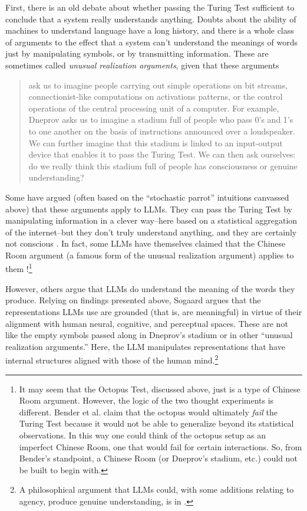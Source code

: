 
First, there is an old debate about whether passing the Turing Test sufficient
to conclude that a system really understands anything. Doubts about the ability
of machines to understand language have a long history, and there is a whole
class of arguments to the effect that a system can't understand the meanings of
words just by manipulating symbols, or by transmitting information. These are
sometimes called \emph{unusual realization arguments}, given that these
arguments
\begin{quote}
ask us to imagine people carrying out simple operations on bit streams,
connectionist-like computations on activations patterns, or the control
operations of the central processing unit of a computer. For example, Dneprov
asks us to imagine a stadium full of people who pass 0's and 1's to one another
on the basis of instructions announced over a loudspeaker. We can further
imagine that this stadium is linked to an input-output device that enables it
to pass the Turing Test. We can then ask ourselves: do we really think this
stadium full of people has consciousness or genuine understanding?
\cite{noelle2022artificial}
\end{quote}

Some have argued (often based on the ``stochastic parrot'' intuitions canvassed
above) that these arguments apply to LLMs. They can pass the Turing Test by
manipulating information in a clever way--here based on a statistical
aggregation of the internet--but they don't truly understand anything, and they
are certainly not conscious \cite{hamid2023chatgpt}. In fact, some LLMs have
themselves claimed that the Chinese Room argument (a famous form of the unusual
realization argument) applies to them \cite{sep-chinese-room}!\footnote{It may seem that the Octopus Test, discussed above, just is a type of Chinese Room argument. However, the logic of the two thought experiments is different. Bender et al. claim that the octopus would ultimately \emph{fail} the Turing Test because it would not be able to generalize beyond its statistical observations. In this way one could think of the octopus setup as an imperfect Chinese Room, one that would fail for certain interactions. So, from Bender's standpoint, a Chinese Room (or Dneprov's stadium, etc.) could not be built to begin with. }

However, others argue that LLMs do understand the meaning of the words they
produce. Relying on findings presented above, Sogaard
\cite{sogaard2023grounding} argues that the representations LLMs use are
grounded (that is, are meaningful) in virtue of their alignment with human
neural, cognitive, and perceptual spaces. These are not like the empty symbols
passed along in Dneprov's stadium or in other ``unusual realization
arguments.'' Here, the LLM manipulates representations that have internal
structures aligned with those of the human mind.\footnote{A philosophical
argument that LLMs could, with some additions relating to agency, produce
genuine understanding, is in \cite{borg2025llms}.} 

